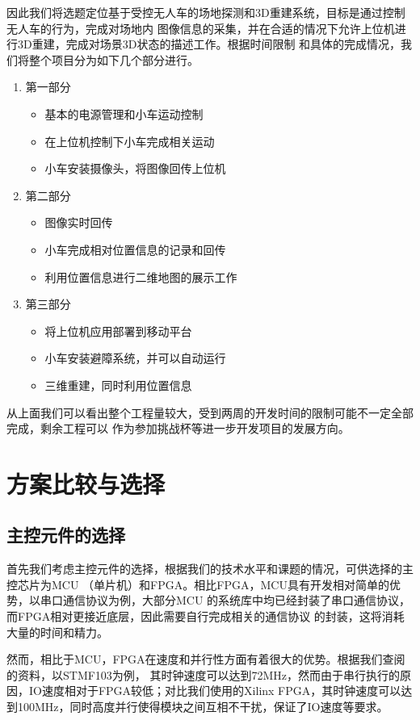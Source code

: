 \documentclass[a4paper]{paper}
\begin{document}
因此我们将选题定位基于受控无人车的场地探测和3D重建系统，目标是通过控制无人车的行为，完成对场地内
图像信息的采集，并在合适的情况下允许上位机进行3D重建，完成对场景3D状态的描述工作。根据时间限制
和具体的完成情况，我们将整个项目分为如下几个部分进行。
\begin{enumerate}
    \item 第一部分
    \begin{itemize}
        \item 基本的电源管理和小车运动控制
        \item 在上位机控制下小车完成相关运动
        \item 小车安装摄像头，将图像回传上位机
    \end{itemize}
    \item 第二部分
    \begin{itemize}
        \item 图像实时回传
        \item 小车完成相对位置信息的记录和回传
        \item 利用位置信息进行二维地图的展示工作
    \end{itemize}
    \item 第三部分
    \begin{itemize}
        \item 将上位机应用部署到移动平台
        \item 小车安装避障系统，并可以自动运行
        \item 三维重建，同时利用位置信息
    \end{itemize}
\end{enumerate}
从上面我们可以看出整个工程量较大，受到两周的开发时间的限制可能不一定全部完成，剩余工程可以
作为参加挑战杯等进一步开发项目的发展方向。

\section{方案比较与选择}
\subsection{主控元件的选择}
首先我们考虑主控元件的选择，根据我们的技术水平和课题的情况，可供选择的主控芯片为MCU
（单片机）和FPGA。相比FPGA，MCU具有开发相对简单的优势，以串口通信协议为例，大部分MCU
的系统库中均已经封装了串口通信协议，而FPGA相对更接近底层，因此需要自行完成相关的通信协议
的封装，这将消耗大量的时间和精力。

然而，相比于MCU，FPGA在速度和并行性方面有着很大的优势。根据我们查阅的资料，以STMF103为例，
其时钟速度可以达到72MHz，然而由于串行执行的原因，IO速度相对于FPGA较低；对比我们使用的Xilinx
FPGA，其时钟速度可以达到100MHz，同时高度并行使得模块之间互相不干扰，保证了IO速度等要求。
\end{document}
